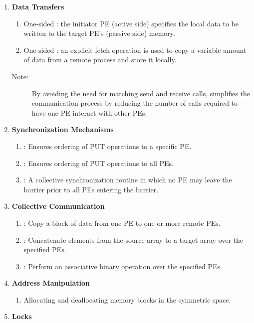 \begin{enumerate}
\item \textbf{Data Transfers }

\begin{enumerate}
\item One-sided  : the initiator \ac{PE} (active side) specifies the local
data to be written to the target \ac{PE}'s (passive side) memory. 
\item One-sided  : an explicit fetch operation is used to copy a variable
amount of data from a remote process and store it locally.\end{enumerate}
\begin{description}
\item [{{Note:}}] By avoiding the need for matching send and receive
calls, \openshmem simplifies the communication process by reducing the
number of calls required to have one \ac{PE} interact with other \ac{PE}s. 
\end{description}
\item \textbf{Synchronization Mechanisms }

\begin{enumerate}
\item {}: Ensures ordering of PUT operations to a specific \ac{PE}. 
\item {}: Ensures ordering of PUT operations to all \ac{PE}s. 
\item {}: A collective synchronization routine in which no \ac{PE} may leave
the barrier prior to all \ac{PE}s entering the barrier. 
\end{enumerate}
\item \textbf{Collective Communication}

\begin{enumerate}
\item {}: Copy a block of data from one \ac{PE} to one or more remote
PEs. 
\item {}: Concatenate elements from the source array to a target
array over the specified \ac{PE}s. 
\item {}: Perform an associative binary operation over the specified
\ac{PE}s. 
\end{enumerate}
\item \textbf{Address Manipulation}

\begin{enumerate}
\item Allocating and deallocating memory blocks in the symmetric space.
\end{enumerate}
\item \textbf{Locks}


\end{enumerate}
